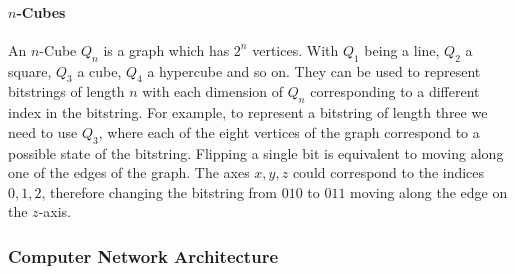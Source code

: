 \documentclass[a4paper, 10pt]{article}
\begin{document}
\paragraph{\(n\)-Cubes}
An \(n\)-Cube \(Q_n\) is a graph which has \( 2^n \) vertices. With \( Q_1 \) being a line, \(Q_2\) a square, \( Q_3 \) a cube, \( Q_4 \) a hypercube and so on. They can be used to represent bitstrings of length \(n\) with each dimension of \(Q_n\) corresponding to a different index in the bitstring. For example, to represent a bitstring of length three we need to use \(Q_3\), where each of the eight vertices of the graph correspond to a possible state of the bitstring. Flipping a single bit is equivalent to moving along one of the edges of the graph. The axes \(x,y,z\) could correspond to the indices \(0,1,2\), therefore changing the bitstring from \(010\) to \(011\) moving along the edge on the \(z\)-axis.
\begin{center}
\end{center}
\subsubsection{Computer Network Architecture}
\end{document}
